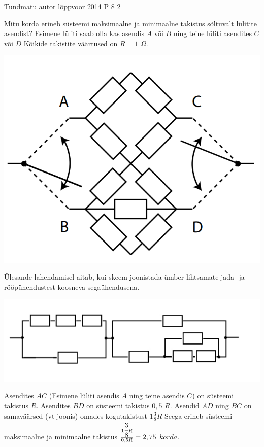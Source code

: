 {Tundmatu autor} %
{lõppvoor} %
{2014} %
{P 8} %
{2} %
{

\ifStatement
Mitu korda erineb süsteemi maksimaalne ja minimaalne takistus sõltuvalt lülitite asendist? Esimene lüliti saab olla kas asendis $A$ või $B$ ning teine lüliti asendites $C$ või $D$ Kõikide takistite väärtused on $R = 1$ $\Omega$.
\begin{center}
	\includegraphics[width=0.5\linewidth]{2014-v3p-08-yl.png}
\end{center}
\fi

\ifHint
Ülesande lahendamisel aitab, kui skeem joonistada ümber lihtsamate jada- ja rööpühendustest koosneva segaühendusena.
\fi

\ifSolution
\begin{center}
	\includegraphics[width=0.5\linewidth]{2014-v3p-08-lah.png}
\end{center}
Asendites $AC$ (Esimene lüliti asendis $A$ ning teine asendis $C$) on süsteemi takistus $R$. Asendites $BD$ on süsteemi takistus $0,5$ $R$. Asendid $AD$ ning $BC$ on samaväärsed (vt joonis) omades kogutakistust $1 \frac{3}{8} R$ Seega erineb süsteemi maksimaalne ja minimaalne takistus $\frac{1 \cfrac{3}{8}R}{0,5R} = 2,75$ $korda$.
\fi
}
